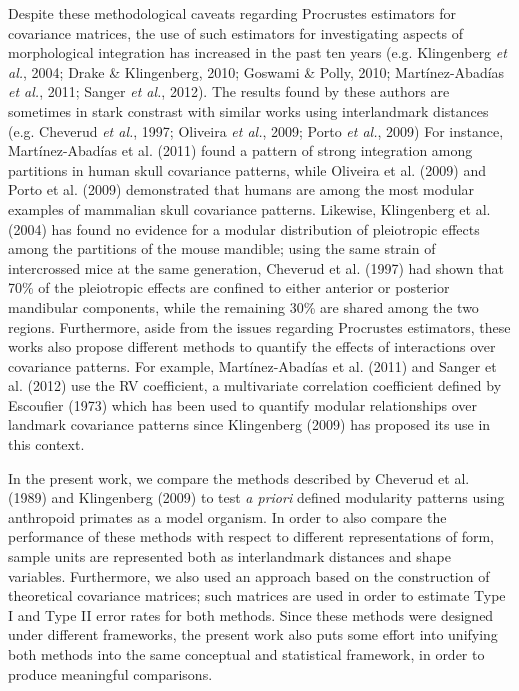 \documentclass[12pt,]{article}
\begin{document}
Despite these methodological caveats regarding Procrustes estimators for
covariance matrices, the use of such estimators for investigating
aspects of morphological integration has increased in the past ten years
(e.g. Klingenberg \emph{et al.}, 2004; Drake \& Klingenberg, 2010;
Goswami \& Polly, 2010; Martínez-Abadías \emph{et al.}, 2011; Sanger
\emph{et al.}, 2012). The results found by these authors are sometimes
in stark constrast with similar works using interlandmark distances
(e.g. Cheverud \emph{et al.}, 1997; Oliveira \emph{et al.}, 2009; Porto
\emph{et al.}, 2009) For instance, Martínez-Abadías et al. (2011) found
a pattern of strong integration among partitions in human skull
covariance patterns, while Oliveira et al. (2009) and Porto et al.
(2009) demonstrated that humans are among the most modular examples of
mammalian skull covariance patterns. Likewise, Klingenberg et al. (2004)
has found no evidence for a modular distribution of pleiotropic effects
among the partitions of the mouse mandible; using the same strain of
intercrossed mice at the same generation, Cheverud et al. (1997) had
shown that 70\% of the pleiotropic effects are confined to either
anterior or posterior mandibular components, while the remaining 30\%
are shared among the two regions. Furthermore, aside from the issues
regarding Procrustes estimators, these works also propose different
methods to quantify the effects of interactions over covariance
patterns. For example, Martínez-Abadías et al. (2011) and Sanger et al.
(2012) use the RV coefficient, a multivariate correlation coefficient
defined by Escoufier (1973) which has been used to quantify modular
relationships over landmark covariance patterns since Klingenberg (2009)
has proposed its use in this context.

In the present work, we compare the methods described by Cheverud et al.
(1989) and Klingenberg (2009) to test \emph{a priori} defined modularity
patterns using anthropoid primates as a model organism. In order to also
compare the performance of these methods with respect to different
representations of form, sample units are represented both as
interlandmark distances and shape variables. Furthermore, we also used
an approach based on the construction of theoretical covariance
matrices; such matrices are used in order to estimate Type I and Type II
error rates for both methods. Since these methods were designed under
different frameworks, the present work also puts some effort into
unifying both methods into the same conceptual and statistical
framework, in order to produce meaningful comparisons.
\end{document}
